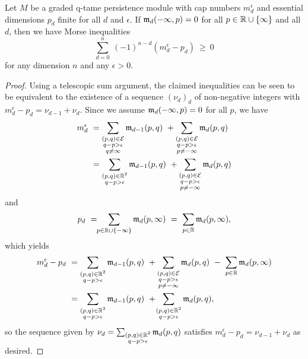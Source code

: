 \begin{thm} \label{t:inequalities}
	Let $M$ be a graded q-tame persistence module with cap numbers $m_{d}^{\epsilon}$ and essential dimensions $p_{d}$ finite for all $d$ and $\epsilon$.
	If $\mathfrak{m}_d(-\infty, p) = 0$ for all $p \in \mathbb{R} \cup \{\infty\}$ and all $d$, then we have Morse inequalities
	\begin{equation} \label{e:morse inequalities}
	\sum_{d=0}^n \ (-1)^{n-d} (m^{\epsilon}_{d} - p_{d}) \ \geq\ 0
	\end{equation}
	for any dimension $n$ and any $\epsilon > 0$.
\end{thm}

\begin{proof}
	Using a telescopic sum argument, the claimed inequalities can be seen to be equivalent to the existence of a sequence $(\nu_d)_d$ of non-negative integers with $m^{\epsilon}_{d} - p_{d} = \nu_{d-1} + \nu_{d}$.
	Since we assume $\mathfrak{m}_d(-\infty, p) = 0$ for all $p$, we have
	\begin{align*}
	m^{\epsilon}_{d}\ &=
	\sum_{\substack{(p,q) \in \mathcal{E} \\ q-p > \epsilon \\ q \neq \infty}} \mathfrak{m}_{d-1}(p,q) \ +
	\sum_{\substack{(p,q) \in \mathcal{E} \\ q-p > \epsilon \\ p \neq -\infty}} \mathfrak{m}_d(p,q) \\ &=
	\sum_{\substack{(p,q) \in \mathbb{R}^2 \\ q-p > \epsilon }} \mathfrak{m}_{d-1}(p,q) \ +
	\sum_{\substack{(p,q) \in \mathcal{E} \\ q-p > \epsilon \\ p \neq -\infty}} \mathfrak{m}_d(p,q)
	\end{align*}
	and
	\begin{equation*}
	p_{d} \ = \!\!
	\sum_{p \in \mathbb{R} \cup \{-\infty\}} \mathfrak{m}_d(p,\infty) \ = \
	\sum_{p \in \mathbb{R}} \mathfrak{m}_d(p,\infty),
	\end{equation*}
	which yields
	\begin{align*}
	m^{\epsilon}_{d} - p_{d} \ &= 
	\sum_{\substack{(p,q) \in \mathbb{R}^2 \\ q-p > \epsilon}} \mathfrak{m}_{d-1}(p,q) \ +
	\sum_{\substack{(p,q) \in \mathcal{E} \\ q-p > \epsilon \\ p \neq -\infty}} \mathfrak{m}_d(p,q)	\ - \
	\sum_{p \in \mathbb{R}} \mathfrak{m}_d(p,\infty) \\	&=
	\sum_{\substack{(p,q) \in \mathbb{R}^2 \\ q-p > \epsilon}} \mathfrak{m}_{d-1}(p,q)
	\ + \!
	\sum_{\substack{(p,q) \in \mathbb{R}^2 \\ q-p > \epsilon}} \mathfrak{m}_d(p,q),
	\end{align*}
	so the sequence given by $\nu_d = \sum_{\substack{(p,q) \in \mathbb{R}^2 \\ q-p > \epsilon}} \mathfrak{m}_d(p,q)$ satisfies $m^{\epsilon}_{d} - p_{d} = \nu_{d-1} + \nu_{d}$ as desired.
\end{proof}

